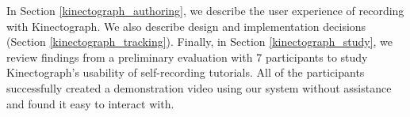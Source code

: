 In Section \ref{kinectograph_authoring}, we describe the user experience of recording with Kinectograph. We also describe design and implementation decisions (Section \ref{kinectograph_tracking}). Finally, in Section \ref{kinectograph_study}, we review findings from a preliminary evaluation with 7 participants to study Kinectograph's usability of self-recording tutorials. All of the participants successfully created a demonstration video using our system without assistance and found it easy to interact with.


